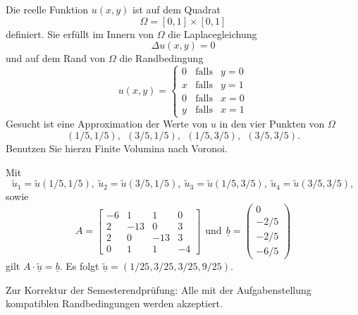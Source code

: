 Die reelle Funktion $u(x,y)$ ist auf dem Quadrat
\[
\Omega = [0, 1] \times [0,1]
\]
definiert. Sie erfüllt im Innern von $\Omega$ die Laplacegleichung
\[
\Delta u(x,y) = 0
\]
und auf dem Rand von $\Omega$ die Randbedingung
\[
u(x,y) = \left\{
\begin{array}{ccl}
0 & \text{falls} & y = 0 \\
x & \text{falls} & y = 1 \\
0 & \text{falls} & x = 0 \\
y & \text{falls} & x = 1
\end{array} \right.
\]
Gesucht ist eine Approximation der Werte von $u$ in den vier Punkten
von $\Omega$
\[
(1/5,1/5), \ \  (3/5,1/5), \ \ (1/5,3/5), \ \  (3/5,3/5).
\]
Benutzen Sie hierzu Finite Volumina nach Voronoi.  

\begin{loesung}
Mit
\[
\tilde u_1 = \tilde u(1/5,1/5), \ 
\tilde u_2 = \tilde u(3/5,1/5), \ 
\tilde u_3 = \tilde u(1/5,3/5), \ 
\tilde u_4 = \tilde u(3/5,3/5),
\]
sowie
\[
A
=
\left[
\begin{array}{rrrr}
-6 & 1 & 1 & 0 \\
 2 & -13 & 0 & 3 \\
 2 & 0 & -13 & 3 \\
 0 & 1 & 1 & -4
\end{array}
\right]
\ \ \text{und} \ \
\underline{b}
=
\begin{pmatrix}
0 \\ -2/5 \\ -2/5 \\ -6/5
\end{pmatrix}
\]
\vspace{5mm}  
gilt $A \cdot \underline{\tilde u} = \underline{b}$.
Es folgt $\underline{\tilde u} = (1/25, 3/25, 3/25, 9/25).$

Zur Korrektur der Semesterendprüfung: Alle mit der Aufgabenstellung
kompatiblen Randbedingungen werden akzeptiert.
\end{loesung}

